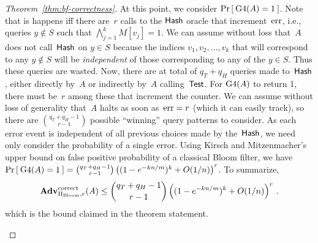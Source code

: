 \begin{proof}[Theorem~\ref{thm:bf-correctness}]
At this point, we consider $\Pr\left[\: \text{G4}(A)=1 \:\right]$.  Note that is
happens iff there are~$r$ calls to the $\mathsf{Hash}$ oracle that
increment~$\mathrm{err}$, i.e., queries $y \not\in S$ such that
$\bigwedge_{j=1}^{k} M[v_j]=1$.  We can assume without loss that~$A$
does not call~$\mathsf{Hash}$ on $y \in S$ because the indices
$v_1,v_2,\ldots,v_k$ that will correspond to any $y \not\in S$ will
be \emph{independent} of those corresponding to any of the $y \in
S$. Thus these queries are wasted.  Now, there are at total of $q_T
+ q_H$ queries made to~$\mathsf{Hash}$, either directly by~$A$ or
indirectly by~$A$ calling~$\mathsf{Test}$.  For $\game{4}(A)$ to
return 1, there must be~$r$ among these that increment the counter.
We can assume without loss of generality that~$A$ halts as soon
as~$\mathrm{err}=r$ (which it can easily track), so there are
$\binom{q_T+q_H-1}{r-1}$ possible ``winning'' query patterns to
consider.  As each error event is independent of all previous
choices made by the~$\mathsf{Hash}$, we need only consider the
probability of a single error. Using Kirsch and
Mitzenmacher's~\cite{kirsch2006less} upper bound on false positive
probability of a classical Bloom filter, we have
$\Pr\left[\: \text{G4}(A)=1 \:\right] = \binom{q_T+q_H-1}{r-1}\left( (1-e^{-kn/m})^k
+ O(1/n) \right)^r$. To summarize,
\[
\mathrm{\mathbf{Adv}}^{\mathrm{correct}}_{\Pi_{\mathrm{Bloom}},r}(A) \leq  {\dbinom{q_T + q_H-1}{r-1}} \left( (1-e^{-kn/m})^k + O(1/n) \right)^r\,.
\]
which is the bound claimed in the theorem statement.
\begin{figure}[tp]
\fpage{.9}{
\hpagessl{.45}{.5}
{
\underline{$\game{4}(A)$} \\ %
$S \getsr A$; $\err \gets 0$;  $\calC \gets \emptyset$\\
$(\pubaux,\privaux) \getsr \Rep^{\HashOracle}(S)$\\
$\bot \getsr A^{\TestOracle,\HashOracle}(\pubaux)$\\
if $\err  < r$ then Return 0\\
Return 1\\

}}
\end{figure}
\end{proof}
